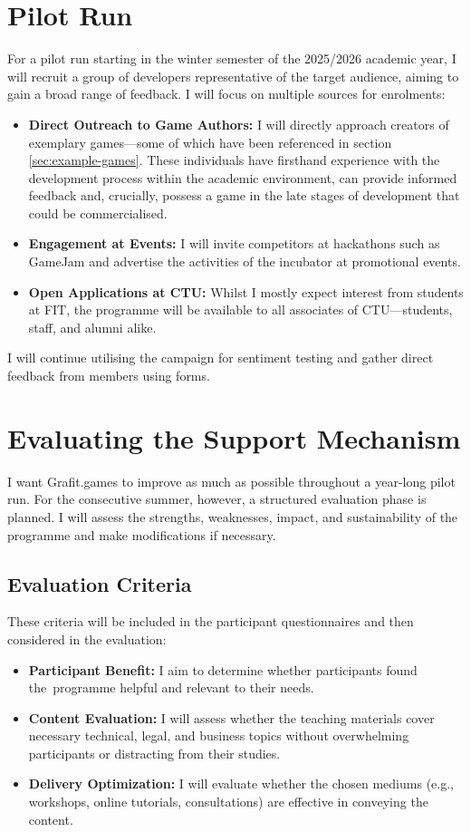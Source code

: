 \section{Pilot Run}
For a pilot run starting in the winter semester of the 2025/2026 academic year, I will recruit a group of developers representative of the target audience, aiming to gain a broad range of feedback. I will focus on multiple sources for enrolments:
\begin{itemize}
    \item \textbf{Direct Outreach to Game Authors:} I will directly approach creators of exemplary games---some of which have been referenced in section \ref{sec:example-games}. These individuals have firsthand experience with the development process within the academic environment, can provide informed feedback and, crucially, possess a game in the late stages of development that could be commercialised.
    \item \textbf{Engagement at Events:} I will invite competitors at hackathons such as GameJam and advertise the activities of the incubator at promotional events.
    \item \textbf{Open Applications at CTU:} Whilst I mostly expect interest from students at FIT, the programme will be available to all associates of CTU---students, staff, and alumni alike.
\end{itemize}
I will continue utilising the campaign for sentiment testing and gather direct feedback from members using forms.

\section{Evaluating the Support Mechanism}
I want Grafit.games to improve as much as possible throughout a year-long pilot run. For the consecutive summer, however, a structured evaluation phase is planned. I will assess the strengths, weaknesses, impact, and sustainability of the programme and make modifications if necessary.

\subsection{Evaluation Criteria}
These criteria will be included in the participant questionnaires and then considered in the evaluation:\begin{itemize}
    \item \textbf{Participant Benefit:} I aim to determine whether participants found the~programme helpful and relevant to their needs.
    \item \textbf{Content Evaluation:} I will assess whether the teaching materials cover necessary technical, legal, and business topics without overwhelming participants or distracting from their studies.
    \item \textbf{Delivery Optimization:} I will evaluate whether the chosen mediums (e.g., workshops, online tutorials, consultations) are effective in conveying the content.
\end{itemize}

